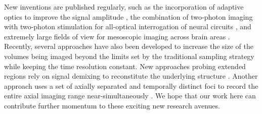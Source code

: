 \documentclass[10pt,letterpaper]{article}
\begin{document}
{New inventions are published regularly, such as the incorporation of adaptive optics to improve the signal amplitude \cite{Yao2023}, the combination of two-photon imaging with two-photon stimulation for all-optical interrogation of neural circuits \cite{Nikolenko2008, Packer2012,Rickgauer2014}, and extremely large fields of view for mesoscopic imaging across brain areas \cite{Sofroniew2016}.  Recently, several approaches have also been developed to increase the size of the volumes being imaged beyond the limits set by the traditional sampling strategy while keeping the time resolution constant. New approaches probing extended regions rely on signal demixing to reconstitute the underlying structure \cite{Song2017, Kazemipour2019}. Another approach uses a set of axially separated and temporally distinct foci to record the entire axial imaging range near-simultaneously \cite{Demas2021}. We hope that our work here can contribute further momentum to these exciting new research avenues.}
\end{document}
